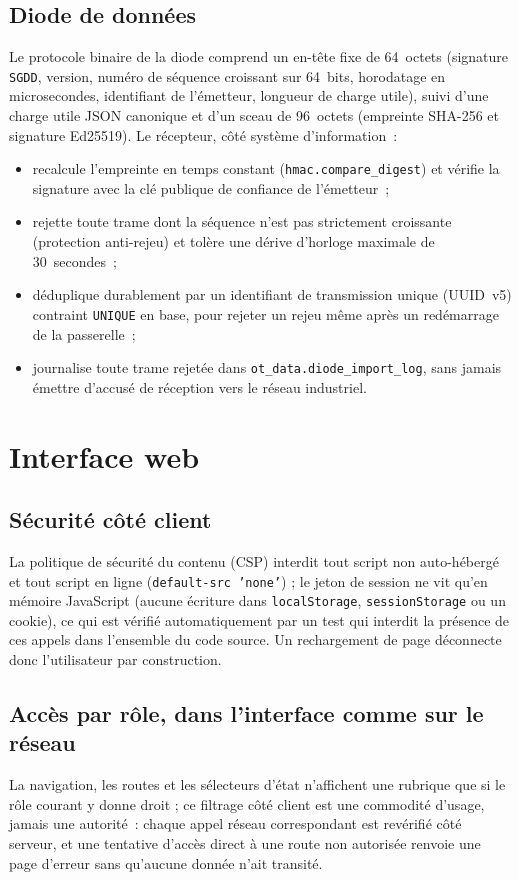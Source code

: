 \documentclass[11pt,a4paper]{report}
\begin{document}
\section{Diode de données}
Le protocole binaire de la diode comprend un en-tête fixe de 64~octets
(signature \texttt{SGDD}, version, numéro de séquence croissant sur 64~bits,
horodatage en microsecondes, identifiant de l'émetteur, longueur de charge
utile), suivi d'une charge utile JSON canonique et d'un sceau de 96~octets
(empreinte SHA-256 et signature Ed25519). Le récepteur, côté système
d'information~:
\begin{itemize}
  \item recalcule l'empreinte en temps constant (\texttt{hmac.compare\_digest})
    et vérifie la signature avec la clé publique de confiance de l'émetteur~;
  \item rejette toute trame dont la séquence n'est pas strictement croissante
    (protection anti-rejeu) et tolère une dérive d'horloge maximale de
    30~secondes~;
  \item déduplique durablement par un identifiant de transmission unique
    (UUID~v5) contraint \texttt{UNIQUE} en base, pour rejeter un rejeu même
    après un redémarrage de la passerelle~;
  \item journalise toute trame rejetée dans
    \texttt{ot\_data.diode\_import\_log}, sans jamais émettre d'accusé de
    réception vers le réseau industriel.
\end{itemize}

\chapter{Interface web}

\section{Sécurité côté client}
La politique de sécurité du contenu (CSP) interdit tout script non
auto-hébergé et tout script en ligne (\texttt{default-src~'none'}) ; le
jeton de session ne vit qu'en mémoire JavaScript (aucune écriture dans
\texttt{localStorage}, \texttt{sessionStorage} ou un cookie), ce qui est
vérifié automatiquement par un test qui interdit la présence de ces appels
dans l'ensemble du code source. Un rechargement de page déconnecte donc
l'utilisateur par construction.

\section{Accès par rôle, dans l'interface comme sur le réseau}
La navigation, les routes et les sélecteurs d'état n'affichent une rubrique
que si le rôle courant y donne droit ; ce filtrage côté client est une
commodité d'usage, jamais une autorité~: chaque appel réseau correspondant
est revérifié côté serveur, et une tentative d'accès direct à une route non
autorisée renvoie une page d'erreur sans qu'aucune donnée n'ait transité.
\end{document}
